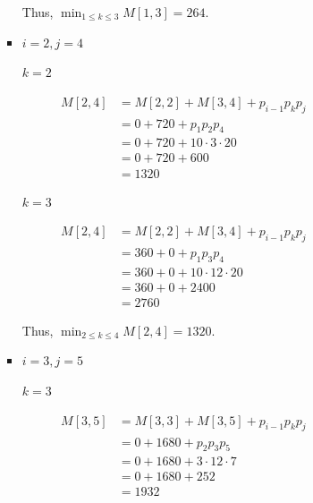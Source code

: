 \documentclass[12pt]{article}
\begin{document}
\begin{enumerate}[1.]
\begin{itemize}
\begin{itemize}
\begin{enumerate}[1.]
\begin{enumerate}[1)]
\begin{itemize}
                        \bigskip

                        Thus, $\min_{1 \leq k \leq 3} M[1,3] = 264$.

                        \item $i = 2, j = 4$

                        \bigskip

                        \underline{$k = 2$}

                        \begin{align}
                            M[2,4] &= M[2,2] + M[3,4] + p_{i-1}p_kp_j\\
                            &= 0 + 720 + p_1p_2p_4\\
                            &= 0 + 720 + 10 \cdot 3 \cdot 20\\
                            &= 0 + 720 + 600\\
                            &= 1320
                        \end{align}

                        \bigskip

                        \underline{$k = 3$}

                        \begin{align}
                            M[2,4] &= M[2,2] + M[3,4] + p_{i-1}p_kp_j\\
                            &= 360 + 0 + p_1p_3p_4\\
                            &= 360 + 0 + 10 \cdot 12 \cdot 20\\
                            &= 360 + 0 + 2400\\
                            &= 2760
                        \end{align}

                        \bigskip

                        Thus, $\min_{2 \leq k \leq 4} M[2,4] = 1320$.

                        \item $i = 3, j = 5$

                        \bigskip

                        \underline{$k = 3$}

                        \begin{align}
                            M[3,5] &= M[3,3] + M[3,5] + p_{i-1}p_kp_j\\
                            &= 0 + 1680 + p_2p_3p_5\\
                            &= 0 + 1680 + 3 \cdot 12 \cdot 7\\
                            &= 0 + 1680 + 252\\
                            &= 1932
                        \end{align}


\end{itemize}
\end{enumerate}
\end{enumerate}
\end{itemize}
\end{itemize}
\end{enumerate}
\end{document}

